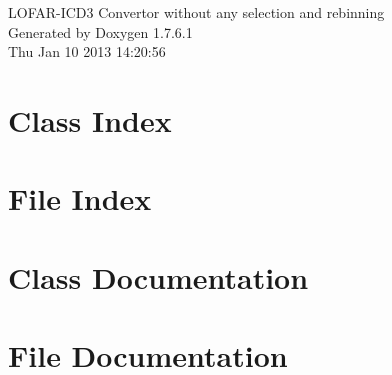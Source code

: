 \documentclass[a4paper]{book}
\begin{document}
\begin{titlepage}
\vspace*{7cm}
\begin{center}
{\Large \-L\-O\-F\-A\-R-\/\-I\-C\-D3 \-Convertor without any selection and rebinning }\\
\vspace*{1cm}
{\large \-Generated by Doxygen 1.7.6.1}\\
\vspace*{0.5cm}
{\small Thu Jan 10 2013 14:20:56}\\
\end{center}
\end{titlepage}
\clearemptydoublepage
{}
\tableofcontents
\clearemptydoublepage
{}
\chapter{\-Class \-Index}

\chapter{\-File \-Index}

\chapter{\-Class \-Documentation}





\chapter{\-File \-Documentation}











\printindex
\end{document}
